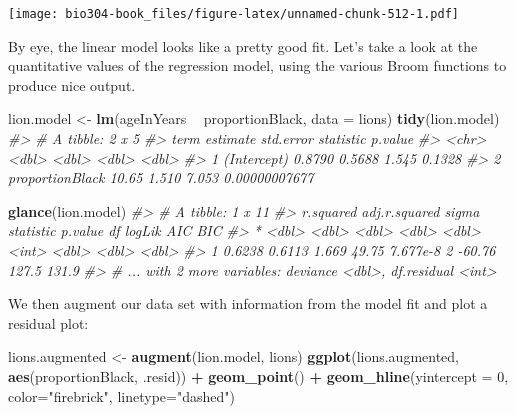 \documentclass[]{book}
\newenvironment{Shaded}{\begin{snugshade}}{\end{snugshade}}
\newcommand{\CommentTok}[1]{\textcolor[rgb]{0.56,0.35,0.01}{\textit{#1}}}
\newcommand{\DataTypeTok}[1]{\textcolor[rgb]{0.13,0.29,0.53}{#1}}
\newcommand{\DecValTok}[1]{\textcolor[rgb]{0.00,0.00,0.81}{#1}}
\newcommand{\KeywordTok}[1]{\textcolor[rgb]{0.13,0.29,0.53}{\textbf{#1}}}
\newcommand{\NormalTok}[1]{#1}
\newcommand{\OperatorTok}[1]{\textcolor[rgb]{0.81,0.36,0.00}{\textbf{#1}}}
\newcommand{\StringTok}[1]{\textcolor[rgb]{0.31,0.60,0.02}{#1}}
\theoremstyle{definition}
\theoremstyle{definition}
\theoremstyle{definition}
\theoremstyle{remark}
\begin{document}
\texttt{[image: bio304-book\_files/figure-latex/unnamed-chunk-512-1.pdf]}

By eye, the linear model looks like a pretty good fit. Let's take a look
at the quantitative values of the regression model, using the various
Broom functions to produce nice output.

\begin{Shaded}
\begin{Highlighting}[]
\NormalTok{lion.model <-}\StringTok{ }\KeywordTok{lm}\NormalTok{(ageInYears }\OperatorTok{~}\StringTok{ }\NormalTok{proportionBlack, }\DataTypeTok{data =}\NormalTok{ lions)}
\KeywordTok{tidy}\NormalTok{(lion.model)}
\CommentTok{#> # A tibble: 2 x 5}
\CommentTok{#>   term            estimate std.error statistic       p.value}
\CommentTok{#>   <chr>              <dbl>     <dbl>     <dbl>         <dbl>}
\CommentTok{#> 1 (Intercept)       0.8790    0.5688     1.545 0.1328       }
\CommentTok{#> 2 proportionBlack  10.65      1.510      7.053 0.00000007677}
\end{Highlighting}
\end{Shaded}

\begin{Shaded}
\begin{Highlighting}[]
\KeywordTok{glance}\NormalTok{(lion.model)}
\CommentTok{#> # A tibble: 1 x 11}
\CommentTok{#>   r.squared adj.r.squared sigma statistic  p.value    df logLik   AIC   BIC}
\CommentTok{#> *     <dbl>         <dbl> <dbl>     <dbl>    <dbl> <int>  <dbl> <dbl> <dbl>}
\CommentTok{#> 1    0.6238        0.6113 1.669     49.75 7.677e-8     2 -60.76 127.5 131.9}
\CommentTok{#> # ... with 2 more variables: deviance <dbl>, df.residual <int>}
\end{Highlighting}
\end{Shaded}

We then augment our data set with information from the model fit and
plot a residual plot:

\begin{Shaded}
\begin{Highlighting}[]
\NormalTok{lions.augmented <-}\StringTok{ }\KeywordTok{augment}\NormalTok{(lion.model, lions)}
\KeywordTok{ggplot}\NormalTok{(lions.augmented, }\KeywordTok{aes}\NormalTok{(proportionBlack, .resid)) }\OperatorTok{+}\StringTok{ }
\StringTok{  }\KeywordTok{geom_point}\NormalTok{() }\OperatorTok{+}\StringTok{ }
\StringTok{  }\KeywordTok{geom_hline}\NormalTok{(}\DataTypeTok{yintercept =} \DecValTok{0}\NormalTok{, }\DataTypeTok{color=}\StringTok{"firebrick"}\NormalTok{, }\DataTypeTok{linetype=}\StringTok{"dashed"}\NormalTok{)}
\end{Highlighting}
\end{Shaded}
\end{document}
